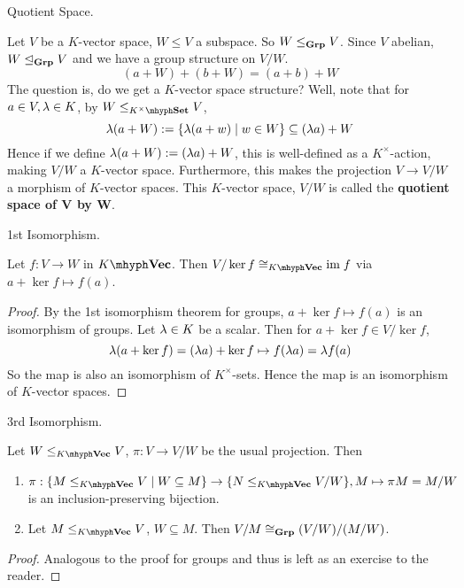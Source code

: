 \documentclass[../book.tex]{subfiles}
\begin{document}
\begin{dfn} Quotient Space.

    Let $V$ be a $K$-vector space, $W \leq V$ a subspace.
    So $W \leq_{\mathbf{Grp}} V$. 
    Since $V$ abelian, $W \trianglelefteq_{\mathbf{Grp}} V$ and we have a group structure on $V / W$.
    \[ 
        (a + W) + (b + W) = (a + b) + W
    \]
    The question is, do we get a $K$-vector space structure?
    Well, note that for $a \in V, \lambda \in K$, 
    by $W \leq_{K^\times\mhyph\Set} V$,
    \[\lambda (a + W) := \{\lambda(a + w) \mid w \in W\} \subseteq (\lambda a) + W\]
    Hence if we define $\lambda(a + W) := (\lambda a) + W$, 
    this is well-defined as a $K^\times$-action,
    making $V/W$ a $K$-vector space.
    Furthermore, this makes the projection $V \to V/W$ 
    a morphism of $K$-vector spaces. 
    This $K$-vector space, $V/W$ is called the \textbf{quotient space of V by W}.
\end{dfn}
\begin{thm} 1st Isomorphism. 
    
    Let $f : V \to W$ in $\KVec$. 
    Then $V / \ker f \iso_{\KVec} \im f$ via $a + \ker f \mapsto f(a)$.
\end{thm}
\begin{proof}
    By the 1st isomorphism theorem for groups, 
    $a + \ker f \mapsto f(a)$ is an isomorphism of groups. 
    Let $\lambda \in K$ be a scalar. 
    Then for $a + \ker f \in V/\ker f$, 
    \[
        \lambda(a + \ker f) = (\lambda a) + \ker f \mapsto 
        f(\lambda a) = \lambda f(a)
    \]
    So the map is also an isomorphism of $K^\times$-sets.
    Hence the map is an isomorphism of $K$-vector spaces. 
\end{proof}
\begin{thm} 3rd Isomorphism. 

    Let $W \leq_{\KVec} V$, $\pi : V \to V/W$ be the usual projection. 
    Then 
    \begin{enumerate}
        \item $\pi : 
        \{M \leq_{\KVec} V \mid W \subseteq M\} \to \{N \leq_{\KVec} V/W\}, 
        M \mapsto \pi M = M/W$ is an inclusion-preserving bijection.
        \item Let $M \leq_{\KVec} V$, $W \subseteq M$. 
        Then $V / M \cong_{\mathbf{Grp}} (V / W) / (M / W)$. 
    \end{enumerate}
\end{thm}
\begin{proof}
    Analogous to the proof for groups
    and thus is left as an exercise to the reader. 
\end{proof}
\end{document}
